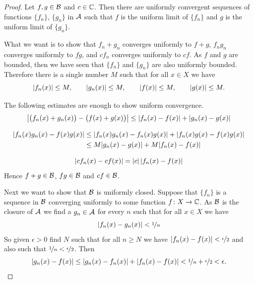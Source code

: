 \begin{proof}
Let $f, g \in {\mathcal{B}}$ and $c \in {\mathbb{C}}$.  Then there are uniformly convergent
sequences of functions $\{ f_n \}$, $\{ g_n \}$ in ${\mathcal{A}}$ such that
$f$ is the uniform limit of $\{ f_n \}$ and
$g$ is the uniform limit of $\{ g_n \}$.

What we want is to show that $f_n+g_n$ converges uniformly to $f+g$,
$f_ng_n$ converges uniformly to $fg$, and
$cf_n$ converges uniformly to $cf$.  As $f$ and $g$ are bounded, then
we have seen that $\{ f_n \}$ and $\{ g_n \}$ are also uniformly bounded.
Therefore there is a single number $M$ such that for all $x \in X$ we have
\begin{equation*}
\lvert {f_n(x)} \rvert \leq M, \qquad
\lvert {g_n(x)} \rvert \leq M, \qquad
\lvert {f(x)} \rvert \leq M, \qquad
\lvert {g(x)} \rvert \leq M.
\end{equation*}

The following estimates are enough to show uniform convergence.
\begin{equation*}
\left\lvert {\bigl(f_n(x)+g_n(x)\bigr)
-\bigl(f(x)+g(x)\bigr)} \right\rvert
\leq
\lvert {f_n(x)-f(x)} \rvert
+\lvert {g_n(x)-g(x)} \rvert
\end{equation*}

\begin{equation*}
\begin{split}
\lvert {f_n(x)g_n(x)-f(x)g(x)} \rvert
& \leq
\lvert {f_n(x)g_n(x)-f_n(x)g(x)} \rvert
+\lvert {f_n(x)g(x)-f(x)g(x)} \rvert
\\
& \leq
M \lvert {g_n(x)-g(x)} \rvert
+M \lvert {f_n(x)-f(x)} \rvert
\end{split}
\end{equation*}

\begin{equation*}
\lvert {cf_n(x)-cf(x)} \rvert
=
\lvert {c} \rvert\,
\lvert {f_n(x)-f(x)} \rvert
\end{equation*}
Hence $f+g \in {\mathcal{B}}$, $fg \in {\mathcal{B}}$ and $cf \in {\mathcal{B}}$.

Next we want to show that ${\mathcal{B}}$ is uniformly closed.
Suppose that $\{ f_n \}$ is a sequence in ${\mathcal{B}}$ converging
uniformly to some function $f \colon X \to {\mathbb{C}}$.
As ${\mathcal{B}}$ is the closure of ${\mathcal{A}}$ we find a $g_n \in {\mathcal{A}}$ for
every $n$ such that for all $x \in X$ we have
\begin{equation*}
\lvert {f_n(x)-g_n(x)} \rvert < \nicefrac{1}{n}
\end{equation*}
So given $\epsilon > 0$ find $N$ such that for all $n \geq N$
we have $\lvert {f_n(x)-f(x)} \rvert < \nicefrac{\epsilon}{2}$ and
also such that $\nicefrac{1}{n} < \nicefrac{\epsilon}{2}$.  Then
\begin{equation*}
\lvert {g_n(x)-f(x)} \rvert
\leq
\lvert {g_n(x)-f_n(x)} \rvert
+
\lvert {f_n(x)-f(x)} \rvert
< \nicefrac{1}{n} + \nicefrac{\epsilon}{2} < \epsilon .  \qedhere
\end{equation*}
\end{proof}
%

